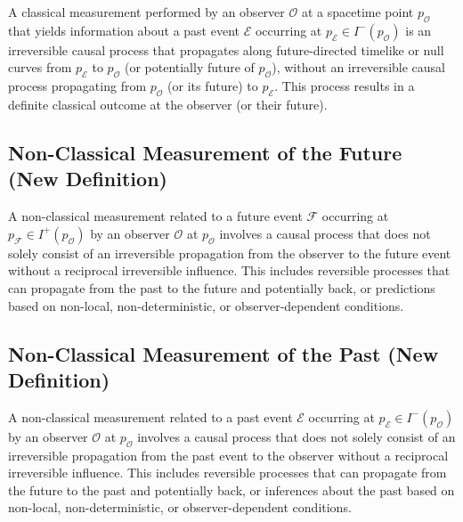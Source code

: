 	\begin{definition}
		A classical measurement performed by an observer $\mathcal{O}$ at a spacetime point $p_{\mathcal{O}}$ that yields information about a past event $\mathcal{E}$ occurring at $p_{\mathcal{E}} \in I^-(p_{\mathcal{O}})$ is an irreversible causal process that propagates along future-directed timelike or null curves from $p_{\mathcal{E}}$ to $p_{\mathcal{O}}$ (or potentially future of $p_{\mathcal{O}}$), without an irreversible causal process propagating from $p_{\mathcal{O}}$ (or its future) to $p_{\mathcal{E}}$. This process results in a definite classical outcome at the observer (or their future).
	\end{definition}
	
	\subsection{Non-Classical Measurement of the Future (New Definition)}
	
	\begin{definition}
		A non-classical measurement related to a future event $\mathcal{F}$ occurring at $p_{\mathcal{F}} \in I^+(p_{\mathcal{O}})$ by an observer $\mathcal{O}$ at $p_{\mathcal{O}}$ involves a causal process that does not solely consist of an irreversible propagation from the observer to the future event without a reciprocal irreversible influence. This includes reversible processes that can propagate from the past to the future and potentially back, or predictions based on non-local, non-deterministic, or observer-dependent conditions.
	\end{definition}
	
	\subsection{Non-Classical Measurement of the Past (New Definition)}
	
	\begin{definition}
		A non-classical measurement related to a past event $\mathcal{E}$ occurring at $p_{\mathcal{E}} \in I^-(p_{\mathcal{O}})$ by an observer $\mathcal{O}$ at $p_{\mathcal{O}}$ involves a causal process that does not solely consist of an irreversible propagation from the past event to the observer without a reciprocal irreversible influence. This includes reversible processes that can propagate from the future to the past and potentially back, or inferences about the past based on non-local, non-deterministic, or observer-dependent conditions.
	\end{definition}
	
